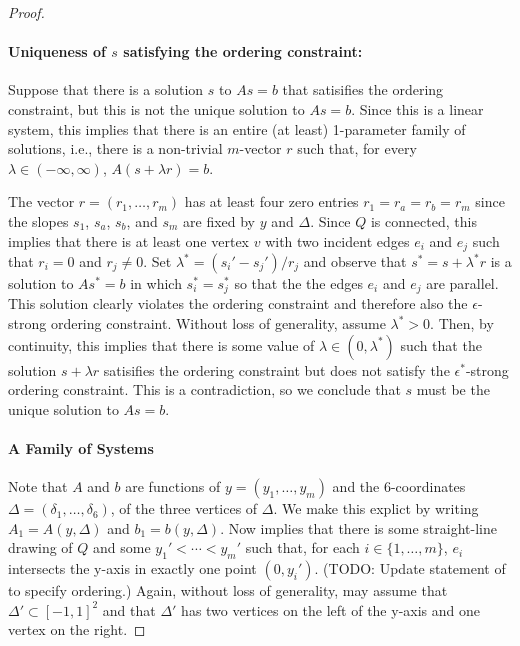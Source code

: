 \documentclass{patmorin}
\begin{document}
\begin{proof}
   \paragraph{Uniqueness of $s$ satisfying the ordering constraint:}

   Suppose that there is a solution $s$ to $As=b$ that satisifies the
   ordering constraint, but this is not the unique solution to $As=b$.
   Since this is a linear system, this implies that there is an entire
   (at least) 1-parameter family of solutions, i.e., there is a non-trivial
   $m$-vector $r$ such that, for every $\lambda\in(-\infty,\infty)$,
   $A(s+\lambda r)=b$.  

   The vector $r=(r_1,\ldots,r_m)$ has at least four
   zero entries $r_1=r_a=r_b=r_m$ since the slopes $s_1$, $s_a$, $s_b$,
   and $s_m$ are fixed by $y$ and $\Delta$.  Since $Q$ is connected, this
   implies that there is at least one vertex $v$ with two incident edges
   $e_i$ and $e_j$ such that $r_i=0$ and $r_j\neq 0$.  Set $\lambda^* =
   (s_i'-s_j')/r_j$ and observe that $s^*=s+\lambda^* r$ is a solution to
   $As^*=b$ in which $s_i^*=s_j^*$ so that the the edges $e_i$ and $e_j$
   are parallel.  This solution clearly violates the ordering constraint
   and therefore also the $\epsilon$-strong ordering constraint.  Without
   loss of generality, assume $\lambda^* >0$. Then, by continuity, this
   implies that there is some value of $\lambda\in (0,\lambda^*)$ such
   that the solution $s+\lambda r$ satisifies the ordering constraint
   but does not satisfy the $\epsilon^*$-strong ordering constraint.
   This is a contradiction, so we conclude that $s$ must be the unique
   solution to $As=b$.

   \paragraph{A Family of Systems}

   Note that $A$ and $b$ are functions of $y=(y_1,\ldots,y_m)$
   and the 6-coordinates $\Delta=(\delta_1,\ldots,\delta_6)$, of
   the three vertices of $\Delta$.  We make this explict by writing
   $A_1=A(y,\Delta)$ and $b_1=b(y,\Delta)$.  Now 
   implies that there is some straight-line drawing of $Q$ and some
   $y_1'<\cdots< y_m'$ such that, for each $i\in\{1,\ldots,m\}$, $e_i$
   intersects the y-axis in exactly one point $(0,y_i')$.  (TODO: Update
   statement of  to specify ordering.)  Again, without loss
   of generality, may assume that $\Delta'\subset [-1,1]^2$ and that
   $\Delta'$ has two vertices on the left of the y-axis and one vertex
   on the right.


\end{proof}
\end{document}
